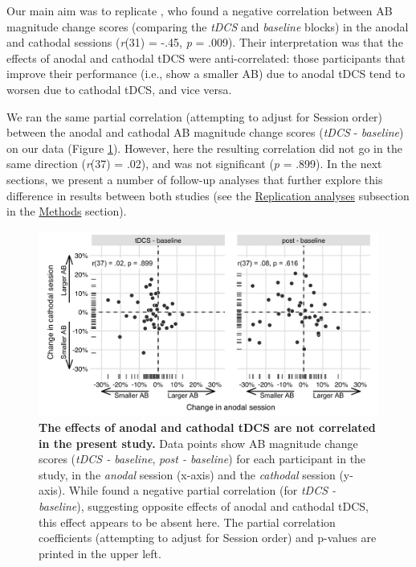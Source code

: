 \documentclass[11pt,]{memoir}
\begin{document}
Our main aim was to replicate \textcite{London2015}, who found a negative correlation between AB magnitude change scores (comparing the \emph{tDCS} and \emph{baseline} blocks) in the anodal and cathodal sessions (\emph{r}(31) = -.45, \emph{p} = .009). Their interpretation was that the effects of anodal and cathodal tDCS were anti-correlated: those participants that improve their performance (i.e., show a smaller AB) due to anodal tDCS tend to worsen due to cathodal tDCS, and vice versa.

We ran the same partial correlation (attempting to adjust for Session order) between the anodal and cathodal AB magnitude change scores (\emph{tDCS} - \emph{baseline}) on our data (Figure \ref{fig:fig-corr}). However, here the resulting correlation did not go in the same direction (\emph{r}(37) = .02), and was not significant (\emph{p} = .899). In the next sections, we present a number of follow-up analyses that further explore this difference in results between both studies (see the \protect\hyperlink{AB_tDCS-rep-analyses}{Replication analyses} subsection in the \protect\hyperlink{AB_tDCS-methods}{Methods} section).

\begin{figure}
\includegraphics[width=5.5in]{AB_tDCS_files/figures/figure_4_corr} \caption{\textbf{The effects of anodal and cathodal tDCS are not correlated in the present study.} Data points show AB magnitude change scores (\emph{tDCS - baseline}, \emph{post - baseline}) for each participant in the study, in the \emph{anodal} session (x-axis) and the \emph{cathodal} session (y-axis). While \textcite{London2015} found a negative partial correlation (for \emph{tDCS - baseline}), suggesting opposite effects of anodal and cathodal tDCS, this effect appears to be absent here. The partial correlation coefficients (attempting to adjust for Session order) and p-values are printed in the upper left.}\label{fig:fig-corr}
\end{figure}
\end{document}
